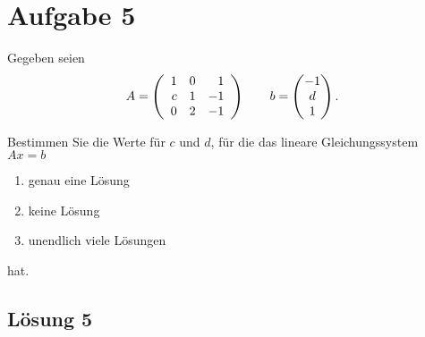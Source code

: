 \documentclass[main.tex]{subfiles}
\begin{document}
\section{Aufgabe 5}
Gegeben seien
$$
    A = \eqmatrix{rrr}{
        1 & 0 & 1 \\
        c & 1 & -1 \\
        0 & 2 & -1}
    \qquad
    b = \vektor{-1 \\ d \\ 1}.
$$

Bestimmen Sie die Werte für $c$ und $d$, für die das lineare Gleichungssystem $Ax=b$
\begin{enumerate}
    \item genau eine Lösung
    \item keine Lösung
    \item unendlich viele Lösungen
\end{enumerate}
hat.

\subsection{Lösung 5}
\end{document}
